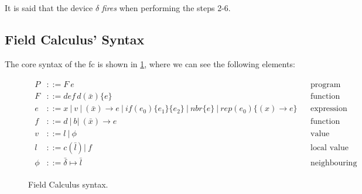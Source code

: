 It is said that the device $\delta$ \textit{fires} when performing the steps 2-6.

\subsection{Field Calculus' Syntax}
\label{subsec:fc-syntax}
The core syntax of the \ac{fc} is shown in \cref{fig:fc-syntax}, where we can see the following elements:

\begin{figure}
    \begin{align*}
        \boxed{
            \begin{aligned}
                P    & ::= F\ e                                                                                                                   &  & \text{program}                  \\
                F    & ::= def \, d(\bar{x}) \{e\}                                                                                                &  & \text{function declaration}     \\
                e    & ::= x \ | \ v \ | \ (\bar{x}) \rightarrow e \ | \ if(e_0)\{e_1\}\{e_2\} \ | \ nbr\{e\} \ | \ rep(e_0)\{(x) \rightarrow e\} &  & \text{expression}               \\
                f    & ::= d \ | \ b    | \     (\bar{x}) \rightarrow e                                                                           &  & \text{function name}            \\
                v    & ::= l \ | \ \phi                                                                                                           &  & \text{value}                    \\
                l    & ::= c(\bar{l})     | \ f                                                                                                   &  & \text{local value}              \\
                \phi & ::= \bar{\delta} \mapsto \bar{l}                                                                                           &  & \text{neighbouring field value}
            \end{aligned}
        }
    \end{align*}
    \caption{Field Calculus syntax\cite{10.1145/3285956}.}
    \label{fig:fc-syntax}
\end{figure}

